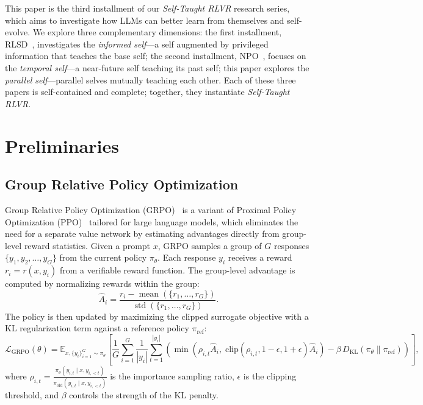 \documentclass{llmxive}
\providecommand{\expect}{\mathbb{E}}
\providecommand{\beginappendix}{\appendix{\titlefont\sffamily \jingdongred{Appendix}\par}}
\begin{document}
This paper is the third installment of our \textit{Self-Taught RLVR} research series, which aims to investigate how LLMs can better learn from themselves and self-evolve. We explore three complementary dimensions: the first installment, RLSD~\cite{yang2026selfdistilledrlvr}, investigates the \textit{informed self}---a self augmented by privileged information that teaches the  base self; the second installment, NPO~\cite{qin2026nearfuturepolicyoptimization}, focuses on the \textit{temporal self}---a near-future self teaching its past self; this paper explores the \textit{parallel self}---parallel selves mutually teaching each other. Each of these three papers is self-contained and complete; together, they instantiate \textit{Self-Taught RLVR}.







% 


% 

\beginappendix
\section{Preliminaries}
\label{sec:preliminary}

\subsection{Group Relative Policy Optimization}
Group Relative Policy Optimization (GRPO)~\cite{grpo} is a variant of Proximal Policy Optimization (PPO)~\cite{schulman2017proximalpolicyoptimizationalgorithms} tailored for large language models, which eliminates the need for a separate value network by estimating advantages directly from group-level reward statistics. Given a prompt $x$, GRPO samples a group of $G$ responses $\{y_1, y_2, \ldots, y_G\}$ from the current policy $\pi_\theta$. Each response $y_i$ receives a reward $r_i = r(x, y_i)$ from a verifiable reward function. The group-level advantage is computed by normalizing rewards within the group:
\begin{equation}
    \hat{A}_i = \frac{r_i - \operatorname{mean}(\{r_1, \ldots, r_G\})}{\operatorname{std}(\{r_1, \ldots, r_G\})}.
\end{equation}
The policy is then updated by maximizing the clipped surrogate objective with a KL regularization term against a reference policy $\pi_{\text{ref}}$:
\begin{equation}
    \mathcal{L}_{\text{GRPO}}(\theta) = \expect_{x, \{y_i\}_{i=1}^{G} \sim \pi_\theta} \left[ \frac{1}{G} \sum_{i=1}^{G} \frac{1}{|y_i|} \sum_{t=1}^{|y_i|} \left( \min\left( \rho_{i,t} \hat{A}_i,\; \text{clip}(\rho_{i,t}, 1-\epsilon, 1+\epsilon) \hat{A}_i \right) - \beta\, D_{\text{KL}}\left(\pi_\theta \| \pi_{\text{ref}}\right) \right) \right],
\end{equation}
where $\rho_{i,t} = \frac{\pi_\theta(y_{i,t} \mid x, y_{i,<t})}{\pi_{\text{old}}(y_{i,t} \mid x, y_{i,<t})}$ is the importance sampling ratio, $\epsilon$ is the clipping threshold, and $\beta$ controls the strength of the KL penalty.
\end{document}
